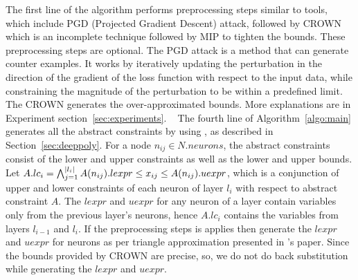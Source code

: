 The first line of the algorithm performs preprocessing steps similar to \alphabeta{} tools, which include 
PGD (Projected Gradient Descent) attack, followed by CROWN~\cite{zhang2018efficient} which is an incomplete technique 
followed by MIP to tighten the bounds. These preprocessing steps are optional. 
The PGD attack is a method that can generate counter examples. It works by iteratively updating the 
perturbation in the direction of the gradient of the loss function with respect to the input data, 
while constraining the magnitude of the perturbation to be within a predefined limit.
The CROWN generates the over-approximated bounds. 
More explanations are in Experiment section~\ref{sec:experiments}. ~
The fourth line of Algorithm~\ref{algo:main} generates all the abstract constraints by using \deeppoly{}, 
as described in Section~\ref{sec:deeppoly}. 
For a node $n_{ij} \in N.neurons$, the abstract constraints consist of the lower and upper constraints as well as the lower and upper bounds. 
Let $A.lc_i = \bigwedge_{j=1}^{|l_i|} A(n_{ij}).lexpr \leq x_{ij} \leq  A(n_{ij}).uexpr$, which is a conjunction of upper and lower 
constraints of each neuron of layer $l_i$ with respect to abstract constraint $A$. 
The $lexpr$ and $uexpr$ for any neuron of a layer contain variables only from the previous layer's neurons, hence $A.lc_i$ contains the variables from layers $l_{i-1}$ and $l_i$. 
If the preprocessing steps is applies then \deeppoly{} generate the $lexpr$ and $uexpr$ for \relu{} neurons as per triangle
approximation presented in \deeppoly{}'s paper. Since the bounds provided by CROWN are precise, so, we do not do 
back substitution while generating the $lexpr$ and $uexpr$. 





